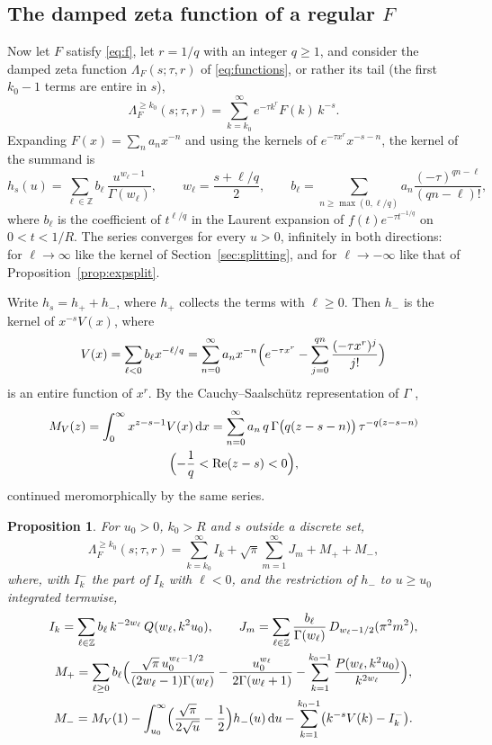 \documentclass[11pt,reqno]{amsart}
\newtheorem{proposition}[theorem]{Proposition}
\theoremstyle{definition}
\theoremstyle{remark}
\newcommand{\dd}{\,\mathrm{d}}
\newcommand{\ZZ}{\mathbb{Z}}
\begin{document}
\subsection{The damped zeta function of a regular $F$}\label{sec:products}
Now let $F$ satisfy \eqref{eq:f}, let $r = 1/q$ with an integer $q \ge 1$, and consider the damped zeta function
$\Lambda_F(s;\tau,r)$ of \eqref{eq:functions}, or rather its tail (the first $k_0 - 1$ terms are entire in $s$),
\[
  \Lambda_F^{\ge k_0}(s;\tau,r) = \sum_{k=k_0}^{\infty}e^{-\tau k^r}F(k)\,k^{-s}.
\]
Expanding $F(x) = \sum_na_nx^{-n}$ and using the kernels of $e^{-\tau x^r}x^{-s-n}$, the kernel of the summand is
\[
  h_s(u) = \sum_{\ell\in\ZZ}b_\ell\,\frac{u^{w_\ell-1}}{\Gamma(w_\ell)}, \qquad w_\ell = \frac{s+\ell/q}{2}, \qquad
  b_\ell = \sum_{n \ge \max(0,\ell/q)}a_n\frac{(-\tau)^{qn-\ell}}{(qn-\ell)!},
\]
where $b_\ell$ is the coefficient of $t^{\ell/q}$ in the Laurent expansion of $f(t)e^{-\tau t^{-1/q}}$ on
$0 < t < 1/R$. The series converges for every $u > 0$, infinitely in both directions: for $\ell \to \infty$ like the
kernel of Section~\ref{sec:splitting}, and for $\ell \to -\infty$ like that of Proposition~\ref{prop:expsplit}.

Write $h_s = h_+ + h_-$, where $h_+$ collects the terms with $\ell \ge 0$. Then $h_-$ is the kernel of $x^{-s}V(x)$,
where
\[
  V(x) = \sum_{\ell<0}b_\ell x^{-\ell/q} = \sum_{n=0}^{\infty}a_nx^{-n}\Bigl(e^{-\tau x^r} - \sum_{j=0}^{qn}\frac{(-\tau x^r)^j}{j!}\Bigr)
\]
is an entire function of $x^r$. By the Cauchy--Saalschütz representation of $\Gamma$ \cite[(5.9.5)]{DLMF},
\begin{multline*}
  M_V(z) = \int_0^\infty x^{z-s-1}V(x)\dd x = \sum_{n=0}^{\infty}a_n\,q\,\Gamma\bigl(q(z-s-n)\bigr)\,\tau^{-q(z-s-n)} \\
  \Bigl(-\frac1q < \operatorname{Re}(z-s) < 0\Bigr),
\end{multline*}
continued meromorphically by the same series.

\begin{proposition}\label{prop:prodsplit}
For $u_0 > 0$, $k_0 > R$ and $s$ outside a discrete set,
\[
  \Lambda_F^{\ge k_0}(s;\tau,r) = \sum_{k=k_0}^{\infty}I_k + \sqrt\pi\sum_{m=1}^{\infty}J_m + M_+ + M_-,
\]
where, with $I^-_k$ the part of $I_k$ with $\ell < 0$, and the restriction of $h_-$ to $u \ge u_0$ integrated termwise,
\begin{gather*}
  I_k = \sum_{\ell\in\ZZ}b_\ell\,k^{-2w_\ell}\,Q(w_\ell, k^2u_0), \qquad
  J_m = \sum_{\ell\in\ZZ}\frac{b_\ell}{\Gamma(w_\ell)}\,D_{w_\ell-1/2}(\pi^2m^2), \\
  M_+ = \sum_{\ell\ge0}b_\ell\Bigl(\frac{\sqrt\pi\,u_0^{w_\ell-1/2}}{(2w_\ell-1)\Gamma(w_\ell)} - \frac{u_0^{w_\ell}}{2\Gamma(w_\ell+1)}
  - \sum_{k=1}^{k_0-1}\frac{P(w_\ell, k^2u_0)}{k^{2w_\ell}}\Bigr), \\
  M_- = M_V(1) - \int_{u_0}^\infty\Bigl(\frac{\sqrt\pi}{2\sqrt u} - \frac12\Bigr)h_-(u)\dd u
  - \sum_{k=1}^{k_0-1}\bigl(k^{-s}V(k) - I^-_k\bigr).
\end{gather*}
\end{proposition}
\end{document}
